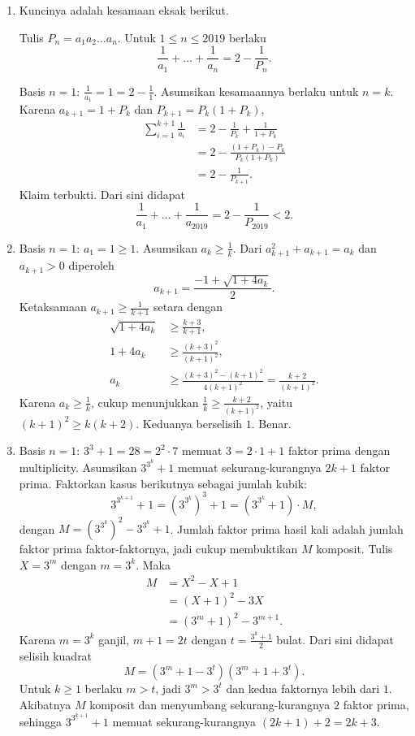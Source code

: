 \documentclass[12pt]{scrartcl}
\begin{document}
\begin{enumerate}
	\item Kuncinya adalah kesamaan eksak berikut.
	\begin{claim}
	Tulis $P_n = a_1 a_2 \dots a_n$. Untuk $1 \le n \le 2019$ berlaku
	\[ \frac{1}{a_1} + \dots + \frac{1}{a_n} = 2 - \frac{1}{P_n}. \]
	\end{claim}
	Basis $n = 1$: $\frac{1}{a_1} = 1 = 2 - \frac{1}{1}$.
	Asumsikan kesamaannya berlaku untuk $n = k$.
	Karena $a_{k+1} = 1 + P_k$ dan $P_{k+1} = P_k(1 + P_k)$,
	\begin{align*}
	\sum_{i=1}^{k+1} \frac{1}{a_i}
	&= 2 - \frac{1}{P_k} + \frac{1}{1 + P_k} \\
	&= 2 - \frac{(1 + P_k) - P_k}{P_k(1 + P_k)} \\
	&= 2 - \frac{1}{P_{k+1}}.
	\end{align*}
	Klaim terbukti.
	Dari sini didapat
	\[ \frac{1}{a_1} + \dots + \frac{1}{a_{2019}}
	= 2 - \frac{1}{P_{2019}} < 2. \]

	\item Basis $n = 1$: $a_1 = 1 \ge 1$.
	Asumsikan $a_k \ge \frac{1}{k}$.
	Dari $a_{k+1}^2 + a_{k+1} = a_k$ dan $a_{k+1} > 0$ diperoleh
	\[ a_{k+1} = \frac{-1 + \sqrt{1 + 4a_k}}{2}. \]
	Ketaksamaan $a_{k+1} \ge \frac{1}{k+1}$ setara dengan
	\begin{align*}
	\sqrt{1 + 4a_k} &\ge \frac{k+3}{k+1}, \\
	1 + 4a_k &\ge \frac{(k+3)^2}{(k+1)^2}, \\
	a_k &\ge \frac{(k+3)^2 - (k+1)^2}{4(k+1)^2}
	= \frac{k+2}{(k+1)^2}.
	\end{align*}
	Karena $a_k \ge \frac{1}{k}$, cukup menunjukkan
	$\frac{1}{k} \ge \frac{k+2}{(k+1)^2}$,
	yaitu $(k+1)^2 \ge k(k+2)$. Keduanya berselisih $1$. Benar.

	\item Basis $n = 1$: $3^3 + 1 = 28 = 2^2 \cdot 7$ memuat $3 = 2\cdot1+1$
	faktor prima dengan multiplicity.
	Asumsikan $3^{3^k} + 1$ memuat sekurang-kurangnya $2k+1$ faktor prima.
	Faktorkan kasus berikutnya sebagai jumlah kubik:
	\[ 3^{3^{k+1}} + 1 = (3^{3^k})^3 + 1 = (3^{3^k} + 1) \cdot M, \]
	dengan $M = (3^{3^k})^2 - 3^{3^k} + 1$.
	Jumlah faktor prima hasil kali adalah jumlah faktor prima faktor-faktornya,
	jadi cukup membuktikan $M$ komposit.
	Tulis $X = 3^m$ dengan $m = 3^k$. Maka
	\begin{align*}
	M &= X^2 - X + 1 \\
	&= (X+1)^2 - 3X \\
	&= (3^m + 1)^2 - 3^{m+1}.
	\end{align*}
	Karena $m = 3^k$ ganjil, $m+1 = 2t$ dengan $t = \frac{3^k+1}{2}$ bulat.
	Dari sini didapat selisih kuadrat
	\[ M = (3^m + 1 - 3^t)(3^m + 1 + 3^t). \]
	Untuk $k \ge 1$ berlaku $m > t$, jadi $3^m > 3^t$
	dan kedua faktornya lebih dari $1$.
	Akibatnya $M$ komposit dan menyumbang sekurang-kurangnya $2$ faktor prima,
	sehingga $3^{3^{k+1}} + 1$ memuat sekurang-kurangnya $(2k+1) + 2 = 2k+3$.


\end{enumerate}
\end{document}
